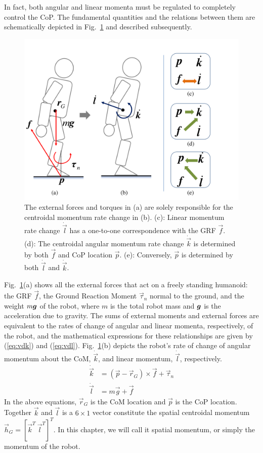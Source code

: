\documentclass{llncs}
\newcommand{\bg}{\mbox{\boldmath $g$}}
\newcommand{\vg}{\vec{g}}
\newcommand{\vp}{\vec{p}}
\newcommand{\vk}{\vec{k}}
\newcommand{\vr}{\vec{r}}
\newcommand{\vtau}{\vec{\tau}}
\newcommand{\vf}{\vec{f}}
\newcommand{\vh}{\vec{h}}
\newcommand{\vdk} {\dot{\vec{k}}}
\newcommand{\vl}{\vec{l}}
\newcommand{\vdl} {\dot{\vec{l}}}
\begin{document}
In fact, both angular and linear momenta
must be regulated to completely control the CoP. The fundamental quantities and the
relations between them are schematically depicted in Fig.~\ref{fig:one2one} and described subsequently.
\begin{figure}[h]
\begin{center}
\includegraphics[width=0.5\columnwidth]{Figures/one2one_new_line.pdf}%
\caption{
The external forces and torques in (a) are solely responsible
for the centroidal momentum rate change in (b).
(c): Linear momentum rate change $\vdl$ has a one-to-one
correspondence with the GRF $\vf$.
(d): The centroidal angular momentum rate change $\vdk$
is determined by both $\vf$ and CoP location $\vp$.
(e): Conversely, $\vp$ is determined by both
$\vdl$ and $\vdk$. %
}
\label{fig:one2one}%
\end{center}
\end{figure}

Fig.~\ref{fig:one2one}(a) shows all the external forces that act on a freely
standing humanoid: the GRF $\vf$, the Ground Reaction Moment
$\vtau_n$ normal to the ground, and the weight $m\bg$ of the robot,
where $m$ is the total robot mass and $\bg$ is the acceleration due to gravity. The
sums of external moments and external forces are equivalent to the rates of change of angular and linear momenta, respectively, of the robot, and the mathematical expressions for these relationships are given by (\ref{eq:vdk}) and (\ref{eq:vdl}). Fig.~\ref{fig:one2one}(b) depicts the robot's
 rate of change of angular momentum about the CoM, $\vdk$, and linear momentum, $\vdl$, respectively.
\begin{align}
	\vdk &= (\vp - \vr_G)\times\vf + \vtau_n \label{eq:vdk}\\
	\vdl &= m\vg + \vf \label{eq:vdl}	
\end{align}
In the above equations, $\vr_G$ is the CoM location and $\vp$ is the CoP location.
Together $\vk$ and $\vl$ is a $6\times 1$ vector constitute the spatial centroidal momentum
$\vh_G=[\vk^T~\vl^T]^T$.
In this chapter, we will call it spatial momentum, or simply the momentum of the robot. 
\end{document}
